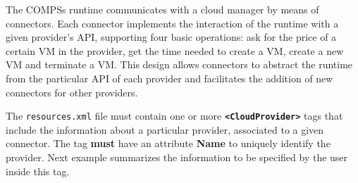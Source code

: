 The COMPSs runtime communicates with a cloud manager by means of connectors. Each connector implements
the interaction of the runtime with a given provider's API, supporting four basic
operations: ask for the price of a certain VM in the provider, get the time needed to create a VM,
create a new VM and terminate a VM. This design allows connectors to abstract the runtime from the particular API
of each provider and facilitates the addition of new connectors for other providers.

The \texttt{resources.xml} file must contain one or more \textbf{\texttt{<CloudProvider>}} tags
that include the information about a particular provider, associated to a given connector. The tag \textbf{must} have an
attribute \textbf{Name} to uniquely identify the provider. Next example summarizes the information to be specified by the
user inside this tag.

\newpage

